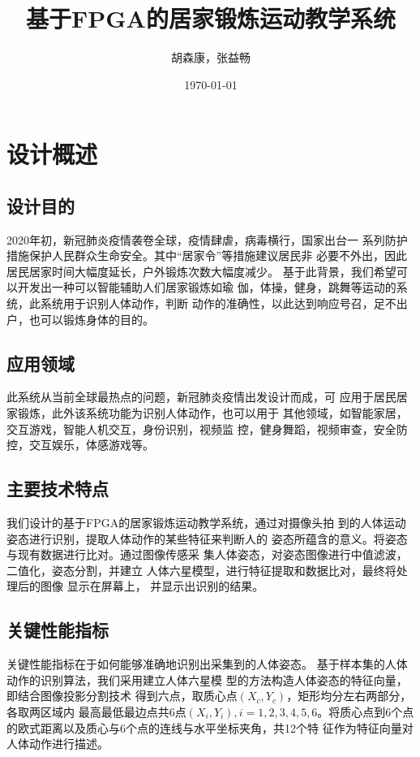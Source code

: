 \documentclass[UTF-8, a4paper, 12pt]{ctexart}
\title{\bfseries \Huge  基于FPGA的居家锻炼运动教学系统}
\author{胡森康，张益畅}
\date{\today}
\begin{document}
\maketitle
\thispagestyle{empty}
\newpage
\thispagestyle{empty}

\tableofcontents
\newpage

\section{设计概述}
\subsection{设计目的}
2020年初，新冠肺炎疫情袭卷全球，疫情肆虐，病毒横行，国家出台一
系列防护措施保护人民群众生命安全。其中“居家令”等措施建议居民非
必要不外出，因此居民居家时间大幅度延长，户外锻炼次数大幅度减少。
基于此背景，我们希望可以开发出一种可以智能辅助人们居家锻炼如瑜
伽，体操，健身，跳舞等运动的系统，此系统用于识别人体动作，判断
动作的准确性，以此达到响应号召，足不出户，也可以锻炼身体的目的。

\subsection{应用领域}
此系统从当前全球最热点的问题，新冠肺炎疫情出发设计而成，可
应用于居民居家锻炼，此外该系统功能为识别人体动作，也可以用于
其他领域，如智能家居，交互游戏，智能人机交互，身份识别，视频监
控，健身舞蹈，视频审查，安全防控，交互娱乐，体感游戏等。

\subsection{主要技术特点}
我们设计的基于FPGA的居家锻炼运动教学系统，通过对摄像头拍
到的人体运动姿态进行识别，提取人体动作的某些特征来判断人的
姿态所蕴含的意义。将姿态与现有数据进行比对。通过图像传感采
集人体姿态，对姿态图像进行中值滤波，二值化，姿态分割，并建立
人体六星模型，进行特征提取和数据比对，最终将处理后的图像
显示在屏幕上，
并显示出识别的结果。

\subsection{关键性能指标}
关键性能指标在于如何能够准确地识别出采集到的人体姿态。
基于样本集的人体动作的识别算法，我们采用建立人体六星模
型的方法构造人体姿态的特征向量，即结合图像投影分割技术
得到六点，取质心点$(X_c,Y_c)$，矩形均分左右两部分，各取两区域内
最高最低最边点共6点$(X_i,Y_i), i=1,2,3,4,5,6$。将质心点到6个点
的欧式距离以及质心与6个点的连线与水平坐标夹角，共12个特
征作为特征向量对人体动作进行描述。
\end{document}
